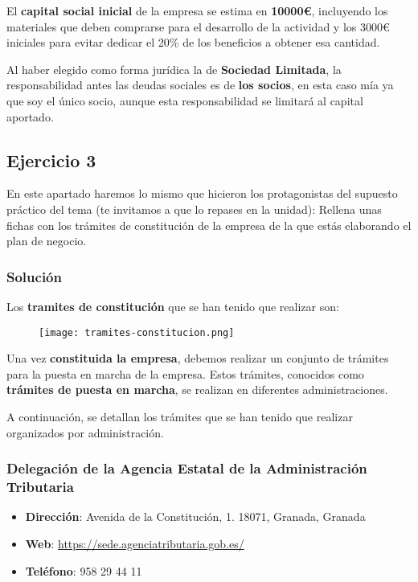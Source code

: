 El \textbf{capital social inicial} de la empresa se estima en \textbf{10000€}, incluyendo los materiales que deben comprarse para el desarrollo de la actividad y los 3000€ iniciales para evitar dedicar el 20\% de los beneficios a obtener esa cantidad.

Al haber elegido como forma jurídica la de \textbf{Sociedad Limitada}, la responsabilidad antes las deudas sociales es de \textbf{los socios}, en esta caso mía ya que soy el único socio, aunque esta responsabilidad se limitará al capital aportado.

\subsection{Ejercicio 3}
En este apartado haremos lo mismo que hicieron los protagonistas del supuesto práctico del tema (te invitamos a que lo repases en la unidad): 	Rellena unas fichas con los trámites de constitución de la empresa de la que estás elaborando el plan de negocio.


\subsubsection{Solución}
Los\textbf{ tramites de constitución} que se han tenido que realizar son:
\begin{figure}[H]
    \centering
    \texttt{[image: tramites-constitucion.png]}
\end{figure}

Una vez \textbf{constituida la empresa}, debemos realizar un conjunto de trámites para la puesta en marcha de la empresa. Estos trámites, conocidos como \textbf{trámites de puesta en marcha}, se realizan en diferentes administraciones.

A continuación, se detallan los trámites que se han tenido que realizar organizados por administración.

\subsubsection*{Delegación de la Agencia Estatal de la Administración Tributaria}
\begin{itemize}
    \item \textbf{Dirección}: Avenida de la Constitución, 1. 18071, Granada, Granada
    \item \textbf{Web}: \url{https://sede.agenciatributaria.gob.es/}
    \item \textbf{Teléfono}: 958 29 44 11
\end{itemize}


